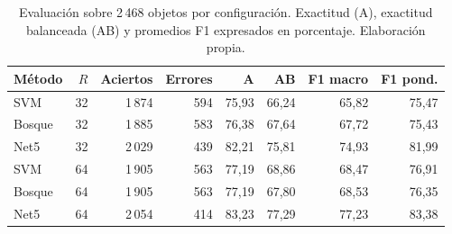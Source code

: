\begin{table}[H]\centering\small
\caption{Evaluación sobre 2\,468 objetos por configuración. Exactitud (A), exactitud balanceada (AB) y promedios F1 expresados en porcentaje. Elaboración propia.}\label{tab:clasificacion-final}
\setlength{\tabcolsep}{4pt}
\begin{tabular}{@{}lrrrrrrr@{}}\toprule
Método & $R$ & Aciertos & Errores & A & AB & F1 macro & F1 pond. \\\midrule
SVM & 32 & 1\,874 & 594 & 75,93 & 66,24 & 65,82 & 75,47 \\
Bosque & 32 & 1\,885 & 583 & 76,38 & 67,64 & 67,72 & 75,43 \\
Net5 & 32 & 2\,029 & 439 & 82,21 & 75,81 & 74,93 & 81,99 \\
SVM & 64 & 1\,905 & 563 & 77,19 & 68,86 & 68,47 & 76,91 \\
Bosque & 64 & 1\,905 & 563 & 77,19 & 67,80 & 68,53 & 76,35 \\
Net5 & 64 & 2\,054 & 414 & 83,23 & 77,29 & 77,23 & 83,38 \\
\bottomrule\end{tabular}\end{table}
